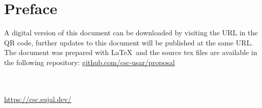 \onecolumn

\chapter*{Preface}
A digital version of this document can be downloaded by visiting the URL in the QR code, further updates to this
document will be published at the same URL. The document was prepared with \LaTeX\ and the source tex files are
available in the following repository:
\href{https://github.com/csc-usar/proposal}{\color{blue}github.com/csc-usar/proposal}
\\\\
\begin{center}
    \\[20pt]
    \href{https://csc.sujal.dev/}{\color{blue}\url{https://csc.sujal.dev/}}
\end{center}

\twocolumn
